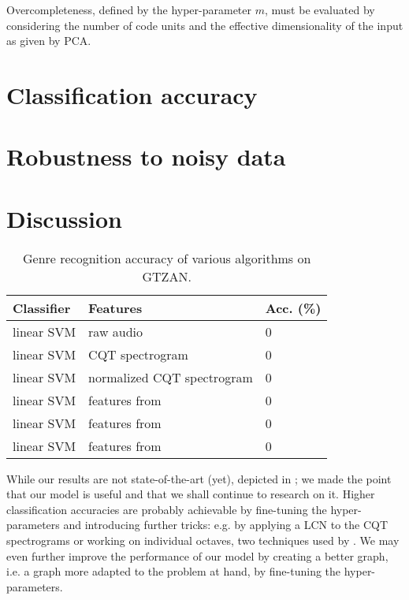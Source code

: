 Overcompleteness, defined by the hyper-parameter $m$, must be evaluated by considering the number of code units and the effective dimensionality of the input as given by \gls{PCA}.

\section{Classification accuracy}

\section{Robustness to noisy data}

\section{Discussion}

\begin{table}
	\begin{center}
		\begin{tabular}{|l|l|l|}
			\hline
			Classifier & Features & Acc. (\%) \\
			\hline
			linear SVM & raw audio & 0 \\
			linear SVM & CQT spectrogram & 0 \\
			linear SVM & normalized CQT spectrogram & 0 \\
			linear SVM & features from \eqnref{eqn:basispursuit} & 0 \\
			linear SVM & features from \eqnref{eqn:minz} & 0 \\
			linear SVM & features from \eqnref{eqn:extraction} & 0 \\
			\hline
		\end{tabular}
	\end{center}
	\caption{Genre recognition accuracy of various algorithms on GTZAN.}
	\label{tab:accuracy_comparison}
\end{table}

While our results are not state-of-the-art (yet), depicted in ; we made the point that our model is useful and that we shall continue to research on it. Higher classification accuracies are probably achievable by fine-tuning the hyper-parameters and introducing further tricks: e.g. by applying a \gls{LCN} to the \gls{CQT} spectrograms or working on individual octaves, two techniques used by \cite{lecun2011PSDaudio}. We may even further improve the performance of our model by creating a better graph, i.e. a graph more adapted to the problem at hand, by fine-tuning the hyper-parameters.